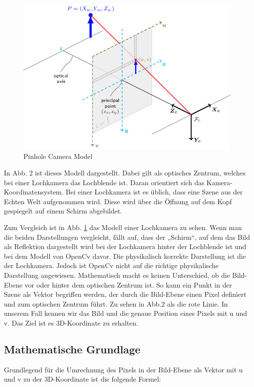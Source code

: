 	\begin{figure}[h]
		\centering
		\includegraphics[width=0.7\linewidth]{img/grundlagen/pinhole_camera_model.png}
		\caption[test]{Pinhole Camera Model}
		\label{fig:pinhole-camera-model}
	\end{figure}

	In Abb. 2 ist dieses Modell dargestellt. Dabei gilt  als optisches Zentrum, welches bei einer Lochkamera das Lochblende ist. Daran orientiert sich das Kamera-Koordinatensystem. Bei einer Lochkamera ist es üblich, dass eine Szene aus der Echten Welt aufgenommen wird. Diese wird über die Öffnung auf dem Kopf gespiegelt auf einem Schirm abgebildet.
	
	
	
	Zum Vergleich ist in Abb. \ref{fig:pinhole-camera-model} das Modell einer Lochkamera zu sehen. Wenn man die beiden Darstellungen vergleicht, fällt auf, dass der „Schirm“, auf dem das Bild als Reflektion dargestellt wird bei der Lochkamera hinter der Lochblende ist und bei dem Modell von OpenCv davor. Die physikalisch korrekte Darstellung ist die der Lochkamera. Jedoch ist OpenCv nicht auf die richtige physikalische Darstellung angewiesen. Mathematisch macht es keinen Unterschied, ob die Bild-Ebene vor oder hinter dem optischen Zentrum ist. So kann ein Punkt in der Szene als Vektor begriffen werden, der durch die Bild-Ebene einen Pixel definiert und zum optischen Zentrum führt. Zu sehen in Abb.2 als die rote Linie. In unserem Fall kennen wir das Bild und die genaue Position eines Pixels mit u und v. Das Ziel ist es 3D-Koordinate zu erhalten.
	
	\subsection{Mathematische Grundlage}
	Grundlegend für die Umrechnung des Pixels in der Bild-Ebene als Vektor mit u und v zu der 3D-Koordinate ist die folgende Formel:
	
